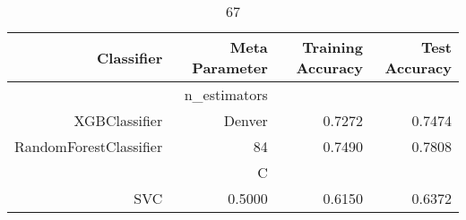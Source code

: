 
\begin{table}[H]
    \caption{67}
    \centering
    \begin{tabular}{|r|r|r|r|}
        \hline
        Classifier &Meta Parameter &Training Accuracy
        &Test Accuracy\\
        \hline
        &n\_estimators &\multicolumn{2}{|r|}{}\\
        \hline
        XGBClassifier &Denver &0.7272 &0.7474\\
        \hline
        RandomForestClassifier &84 &0.7490 &0.7808\\
        \hline
        &C &\multicolumn{2}{|r|}{}\\
        \hline
        SVC &0.5000 &0.6150 &0.6372\\
        \hline
    \end{tabular}
\end{table}
